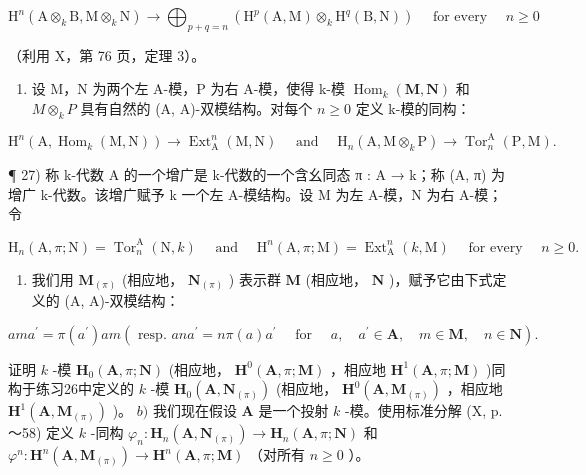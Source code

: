 \[
\mathrm{H} ^ {n} (\mathrm{A} \otimes_ {k} \mathrm{B}, \mathrm{M} \otimes_ {k} \mathrm{N}) \rightarrow \bigoplus_ {p + q = n} \left(\mathrm{H} ^ {p} (\mathrm{A}, \mathrm{M}) \otimes_ {k} \mathrm{H} ^ {q} (\mathrm{B}, \mathrm{N})\right) \quad \text { for   every } \quad n \geqslant 0
\]

（利用 X，第 76 页，定理 3）。

\begin{enumerate}
\def\labelenumi{\alph{enumi})}
\setcounter{enumi}{4}
\tightlist
\item
  设 M，N 为两个左 A-模，P 为右 A-模，使得 k-模 \(\operatorname{Hom}_{k}(\mathbf{M}, \mathbf{N})\) 和 \(M \otimes_{k} P\) 具有自然的 (A, A)-双模结构。对每个 \(n \geqslant 0\) 定义 k-模的同构：
\end{enumerate}

\[
\mathrm{H} ^ {n} (\mathrm{A}, \operatorname{Hom} _ {k} (\mathrm{M}, \mathrm{N})) \rightarrow \operatorname{Ext} _ {\mathrm{A}} ^ {n} (\mathrm{M}, \mathrm{N}) \quad \text { and } \quad \mathrm{H} _ {n} (\mathrm{A}, \mathrm{M} \otimes_ {k} \mathrm{P}) \rightarrow \operatorname{Tor} _ {n} ^ {\mathrm{A}} (\mathrm{P}, \mathrm{M}).
\]

¶ 27) 称 k-代数 A 的一个增广是 k-代数的一个含幺同态 π : A → k；称 (A, π) 为增广 k-代数。该增广赋予 k 一个左 A-模结构。设 M 为左 A-模，N 为右 A-模；令

\[
\mathrm{H} _ {n} (\mathrm{A}, \pi ; \mathrm{N}) = \operatorname{Tor} _ {n} ^ {\mathrm{A}} (\mathrm{N}, k) \quad \text { and } \quad \mathrm{H} ^ {n} (\mathrm{A}, \pi ; \mathrm{M}) = \operatorname{Ext} _ {\mathrm{A}} ^ {n} (k, \mathrm{M}) \quad \text { for   every } \quad n \geqslant 0.
\]

\begin{enumerate}
\def\labelenumi{\alph{enumi})}
\tightlist
\item
  我们用 \(\mathbf{M}_{(\pi)}\) (相应地， \(\mathbf{N}_{(\pi)}\) ) 表示群 \(\mathbf{M}\) (相应地， \(\mathbf{N}\) )，赋予它由下式定义的 (A, A)-双模结构：
\end{enumerate}

\[
a m a ^ {\prime} = \pi (a ^ {\prime}) a m (\text { resp. } a n a ^ {\prime} = n \pi (a) a ^ {\prime} \quad \text { for } \quad a, \quad a ^ {\prime} \in \mathbf {A}, \quad m \in \mathbf {M}, \quad n \in \mathbf {N}).
\]

证明 \(k\) -模 \(\mathbf{H}_0(\mathbf{A}, \pi; \mathbf{N})\) (相应地， \(\mathbf{H}^0(\mathbf{A}, \pi; \mathbf{M})\) ，相应地 \(\mathbf{H}^1(\mathbf{A}, \pi; \mathbf{M})\) )同构于练习26中定义的 \(k\) -模 \(\mathbf{H}_0(\mathbf{A}, \mathbf{N}_{(\pi)})\) (相应地， \(\mathbf{H}^0(\mathbf{A}, \mathbf{M}_{(\pi)})\) ，相应地 \(\mathbf{H}^1(\mathbf{A}, \mathbf{M}_{(\pi)})\) )。 \(b)\) 我们现在假设 \(\mathbf{A}\) 是一个投射 \(k\) -模。使用标准分解 (X, p.～58) 定义 \(k\) -同构 \(\varphi_n: \mathbf{H}_n(\mathbf{A}, \mathbf{N}_{(\pi)}) \to \mathbf{H}_n(\mathbf{A}, \pi; \mathbf{N})\) 和 \(\varphi^n: \mathbf{H}^n(\mathbf{A}, \mathbf{M}_{(\pi)}) \to \mathbf{H}^n(\mathbf{A}, \pi; \mathbf{M})\) （对所有 \(n \geqslant 0\) ）。

